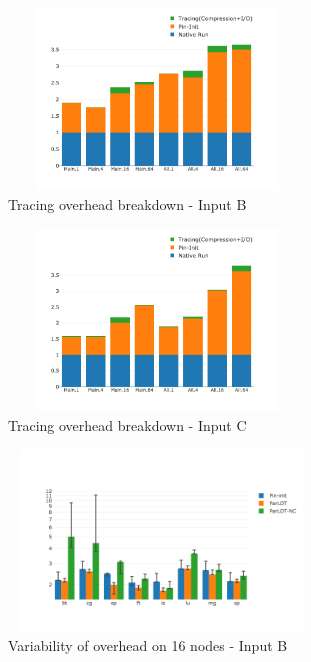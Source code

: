 



\begin{figure}[t]
\centering
\includegraphics[width=3.1in,height=1.9in]{figs.comet.newMed/comet_chartDet_B_wc_byTool_p3_5.png}
\caption{ Tracing overhead breakdown - Input B}
\label{comet_chartDet_B_wc_byTool_p3_5}
\end{figure}


\begin{figure}[t]
\centering
\includegraphics[width=3.1in,height=1.9in]{figs.comet.newMed/comet_chartDet_C_wc_byTool_p3_5.png}
\caption{ Tracing overhead breakdown - Input C}
\label{comet_chartDet_C_wc_byTool_p3_5}
\end{figure}



\begin{figure}[t]
\centering
\includegraphics[width=3.2in,height=1.9in]{figs.comet.newMed/comet_BX2_Main_16_B_p3_5.png}
\caption{ Variability of \parlotm overhead on 16 nodes - Input B}
\label{comet_BX2_Main_16_B_p3_5}
\end{figure}


